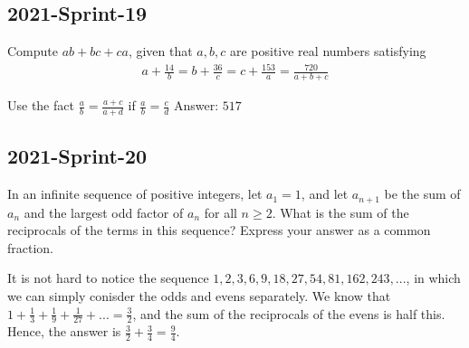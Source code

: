 \documentclass[12pt]{article}
\begin{document}
\subsection*{2021-Sprint-19}
Compute $ab + bc + ca$, given that $a, b, c$ are positive real numbers satisfying
\begin{align*}
a + \frac{14}{b} = b + \frac{36}{c} = c + \frac{153}{a} = \frac{720}{a+b+c}
\end{align*}
\begin{answer}
Use the fact $\frac{a}{b}=\frac{a+c}{a+d}$
if $\frac{a}{b}=\frac{c}{d}$
Answer: $517$
\end{answer}

\subsection*{2021-Sprint-20}
In an infinite sequence of positive integers, let $a_1 = 1$, and let $a_{n+1}$ be the sum of $a_n$ and the largest odd factor of $a_n$ for all $n \ge 2$. What is the sum of the reciprocals of the terms in this sequence? Express your answer as a common fraction.
\begin{answer}
It is not hard to notice the sequence $1, 2, 3, 6, 9, 18, 27, 54, 81, 162, 243, ...$, in which we can simply conisder the odds and evens separately. We know that $1+\frac{1}{3}+\frac{1}{9}+\frac{1}{27}+... = \frac{3}{2}$, and the sum of the reciprocals of the evens is half this. Hence, the answer is $\frac{3}{2}+\frac{3}{4} = \boxed{\frac{9}{4}}$.
\end{answer}

\end{document}
